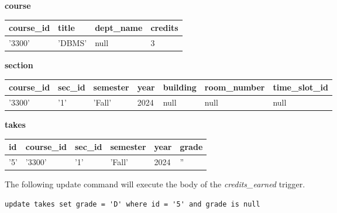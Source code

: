 \documentclass[12pt, addpoints, answers]{exam}
\begin{document}
\begin{questions}
\begin{samepage}
\begin{checkboxes}
\textbf{course}

\begin{tabular}{|l|l|l|l|}
\hline
course\_id & title & dept\_name & credits \\
\hline
'3300' & 'DBMS' & null & 3 \\
\hline
\end{tabular}

\textbf{section}

\begin{tabular}{|l|l|l|l|l|l|l|}
\hline
course\_id & sec\_id & semester & year & building & room\_number & time\_slot\_id \\
\hline
'3300' & '1' & 'Fall' & 2024 & null & null & null \\
\hline
\end{tabular}

\textbf{takes}

\begin{tabular}{|l|l|l|l|l|l|}
\hline
id & course\_id & sec\_id & semester & year & grade \\
\hline
'5' & '3300' & '1' & 'Fall' & 2024 & '' \\
\hline
\end{tabular}

The following update command will execute the body of the \textit{credits\_earned} trigger.
\begin{verbatim}
update takes set grade = 'D' where id = '5' and grade is null
\end{verbatim}
\end{checkboxes}
\end{samepage}

\end{questions}
\end{document}
